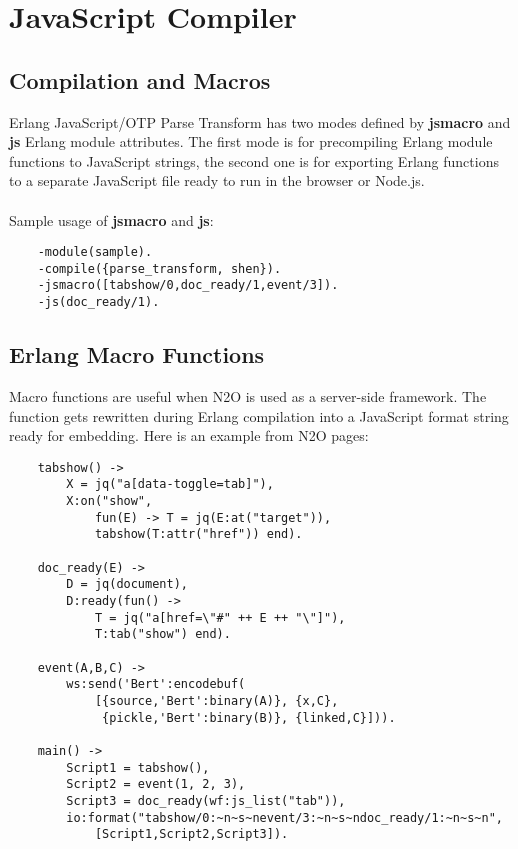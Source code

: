 \section{JavaScript Compiler}

\subsection{Compilation and Macros}
Erlang JavaScript/OTP Parse Transform has two modes defined
by {\bf \-jsmacro} and {\bf \-js} Erlang module attributes.
The first mode is for precompiling Erlang module functions
to JavaScript strings, the second one is for exporting Erlang functions
to a separate JavaScript file ready to run in the browser or Node.js.

\paragraph{}
Sample usage of {\bf \-jsmacro} and {\bf \-js}:

\begin{lstlisting}
    -module(sample).
    -compile({parse_transform, shen}).
    -jsmacro([tabshow/0,doc_ready/1,event/3]).
    -js(doc_ready/1).
\end{lstlisting}

\subsection{Erlang Macro Functions}
Macro functions are useful when N2O is used as a server-side framework.
The function gets rewritten during Erlang compilation into a JavaScript format
string ready for embedding. Here is an example from N2O pages:

\begin{lstlisting}
    tabshow() ->
        X = jq("a[data-toggle=tab]"),
        X:on("show", 
            fun(E) -> T = jq(E:at("target")),
            tabshow(T:attr("href")) end).

    doc_ready(E) ->
        D = jq(document),
        D:ready(fun() ->
            T = jq("a[href=\"#" ++ E ++ "\"]"),
            T:tab("show") end).

    event(A,B,C) ->
        ws:send('Bert':encodebuf(
            [{source,'Bert':binary(A)}, {x,C},
             {pickle,'Bert':binary(B)}, {linked,C}])).

    main() ->
        Script1 = tabshow(),
        Script2 = event(1, 2, 3),
        Script3 = doc_ready(wf:js_list("tab")),
        io:format("tabshow/0:~n~s~nevent/3:~n~s~ndoc_ready/1:~n~s~n",
            [Script1,Script2,Script3]).
\end{lstlisting}


